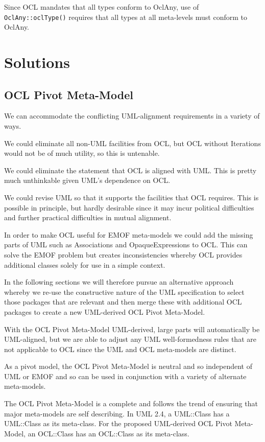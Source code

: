 \documentclass{eceasst}
\begin{document}
Since OCL mandates that all types conform to OclAny, use of \verb|OclAny::oclType()| requires that all types at all meta-levels must conform to OclAny.   

\section{Solutions}\label{Solutions}

\subsection{OCL Pivot Meta-Model}\label{PivotMetaModel}

We can accommodate the conflicting UML-alignment requirements in a variety of ways.

We could eliminate all non-UML facilities from OCL, but OCL without Iterations would not be of much utility, so this is untenable.

We could eliminate the statement that OCL is aligned with UML. This is pretty much unthinkable given UML's dependence on OCL.

We could revise UML so that it supports the facilities that OCL requires. This is possible in principle, but hardly desirable since it may incur political difficulties and further practical difficulties in mutual alignment.

In order to make OCL useful for EMOF meta-models we could add the missing parts of UML such as Associations and OpaqueExpressions to OCL. This can solve the EMOF problem but creates inconsistencies whereby OCL provides additional classes solely for use in a simple context.

In the following sections we will therefore pursue an alternative approach whereby we re-use the constructive nature of the UML specification to select those packages that are relevant and then merge these with additional OCL packages to create a new UML-derived OCL Pivot Meta-Model.

With the OCL Pivot Meta-Model UML-derived, large parts will automatically be UML-aligned, but we are able to adjust any UML well-formedness rules that are not applicable to OCL since the UML and OCL meta-models are distinct.

As a pivot model, the OCL Pivot Meta-Model is neutral and so independent of UML or EMOF and so can be used in conjunction with  a variety of alternate meta-models.

The OCL Pivot Meta-Model is a complete and follows the trend of ensuring that major meta-models are self describing. In UML 2.4, a UML::Class has a UML::Class as its meta-class. For the proposed UML-derived OCL Pivot Meta-Model, an OCL::Class has an OCL::Class as its meta-class.  
\end{document}
